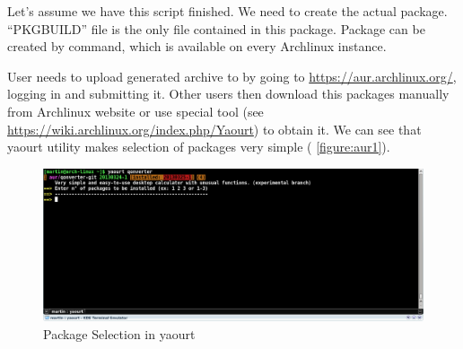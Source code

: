 Let's assume we have this script finished. We need to create the actual package. \enquote{PKGBUILD} file is the only file contained in this package. Package can be created by command, which is available on every Archlinux instance.

User needs to upload generated archive to  by going to \url{https://aur.archlinux.org/}, logging in and submitting it.
 Other users then download this packages manually from Archlinux website or use special tool (see \url{https://wiki.archlinux.org/index.php/Yaourt}) to obtain it. We can see that yaourt utility makes selection of packages very simple ( \autoref{figure:aur1}).
 
\begin{figure}[ht]
\begin{center}
\includegraphics[width=14cm]{graphics/real-world/06-aur1.png}
\caption{Package Selection in yaourt}\label{figure:aur1}
\end{center}
\end{figure}